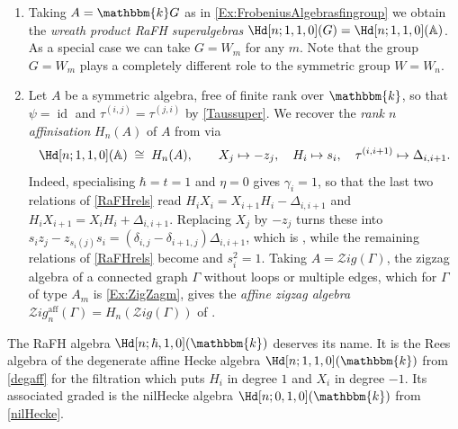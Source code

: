 \documentclass[a4paper,11pt]{amsart}
\numberwithin{equation}{subsection}
\theoremstyle{definition}
\theoremstyle{theorem}
\theoremstyle{remark}
\newcommand\Sym{W}
\newcommand\op{\operatorname}
\newcommand\taui[1][i]{\tau^{(#1)}}
\newcommand\kk{\mathbbm{k}}
\newcommand{\Ao}{\mathbb{A}}
\begin{document}
\begin{Examples}
\begin{enumerate}[resume*=HHexamples]
\item Taking $A=\kk G$ as in \autoref{Ex:FrobeniusAlgebrasfingroup} we
  obtain the \emph{wreath product RaFH superalgebras}
  $\Hd[n;1,1,0](G)=\Hd[n;1,1,0](\Ao)$. As a special case we can take
  $G=\Sym_m$ for any $m$. Note that the group $G=\Sym_m$ plays
  a completely different role to the symmetric group $\Sym=\Sym_n$.
  \item \label{Ex:KMaffinisation}
  Let $A$ be a symmetric algebra, free of finite rank over $\kk$, so that
  $\psi=\op{id}$ and $\taui[i,j]=\taui[j,i]$ by \autoref{Taussuper}. We recover  the \emph{rank $n$ affinisation} $H_n(A)$ of $A$ from
  \cite[Definition~3.2]{KleshchevMuth} via
  \begin{equation}\label{KleshchevMuthiso}
    \Hd[n;1,1,0](\Ao)\;\cong\;H_n(A),
    \qquad X_j\mapsto -z_j,\quad H_i\mapsto s_i,\quad
    \taui[i,i+1]\mapsto\Delta_{i,i+1}.
  \end{equation}
  Indeed, specialising $\hbar=t=1$ and $\eta=0$ gives $\gamma_i=1$, so that the last two
  relations of \autoref{RaFHrels} read $H_iX_i=X_{i+1}H_i-\Delta_{i,i+1}$ and
  $H_iX_{i+1}=X_iH_i+\Delta_{i,i+1}$. Replacing $X_j$ by $-z_j$ turns these into
  $s_iz_j-z_{s_i(j)}s_i=(\delta_{i,j}-\delta_{i+1,j})\Delta_{i,i+1}$, which is
  \cite[(3.5)]{KleshchevMuth}, while the remaining relations of \autoref{RaFHrels} become
  \cite[(3.3),(3.4)]{KleshchevMuth} and $s_i^2=1$. Taking $A=\mathcal{Z}ig(\Gamma)$, the zigzag
  algebra of a connected graph $\Gamma$ without loops or multiple edges, which for $\Gamma$ of
  type $A_m$ is \autoref{Ex:ZigZagm}, gives the \emph{affine zigzag algebra}
  $\mathcal{Z}ig^{\op{aff}}_n(\Gamma)=H_n(\mathcal{Z}ig(\Gamma))$ of
  \cite[Definition~4.4]{KleshchevMuth}.
  \end{enumerate}
\end{Examples}
\begin{Remark} \label{Reesex}The RaFH algebra $\Hd[n;\hbar,1,0](\kk)$ deserves its name. It is the Rees algebra of the degenerate affine Hecke algebra $\Hd[n;1,1,0](\kk)$ from \autoref{degaff} for the  filtration which  puts  $H_i$ in degree $1$ and $X_i$ in degree $-1$. Its associated graded is the nilHecke algebra  $\Hd[n;0,1,0](\kk)$ from \autoref{nilHecke}.
\end{Remark}
\end{document}
